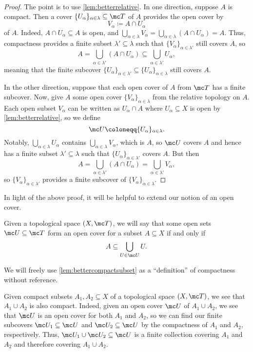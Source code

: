 \documentclass[../notes.tex]{subfiles}
\begin{document}
\begin{proof}
	The point is to use \autoref{lem:betterrelative}. In one direction, suppose $A$ is compact. Then a cover $\{U_\alpha\}_{\alpha\in\lambda}\subseteq\mc T$ of $A$ provides the open cover by
	\[V_\alpha\coloneqq A\cap U_\alpha\]
	of $A$. Indeed, $A\cap U_\alpha\subseteq A$ is open, and $\bigcup_{\alpha\in\lambda}V_\alpha=\bigcup_{\alpha\in\lambda}(A\cap U_\alpha)=A$. Thus, compactness provides a finite subset $\lambda'\subseteq\lambda$ such that $\{V_\alpha\}_{\alpha\in\lambda'}$ still covers $A$, so
	\[A=\bigcup_{\alpha\in\lambda'}(A\cap U_\alpha)\subseteq\bigcup_{\alpha\in\lambda'}U_\alpha,\]
	meaning that the finite subcover $\{U_\alpha\}_{\alpha\in\lambda'}\subseteq\{U_\alpha\}_{\alpha\in\lambda}$ still covers $A$.
	
	In the other direction, suppose that each open cover of $A$ from $\mc T$ has a finite subcover. Now, give $A$ some open cover $\{V_\alpha\}_{\alpha\in\lambda}$ from the relative topology on $A$. Each open subset $V_\alpha$ can be written as $U_\alpha\cap A$ where $U_\alpha\subseteq X$ is open by \autoref{lem:betterrelative}, so we define
	\[\mc U\coloneqq\{U_\alpha\}_{\alpha\in\lambda}.\]
	Notably, $\bigcup_{\alpha\in\lambda}U_\alpha$ contains $\bigcup_{\alpha\in\lambda}V_\alpha$, which is $A$, so $\mc U$ covers $A$ and hence has a finite subset $\lambda'\subseteq\lambda$ such that $\{U_\alpha\}_{\alpha\in\lambda'}$ covers $A$. But then
	\[A=\bigcup_{\alpha\in\lambda'}(A\cap U_\alpha)=\bigcup_{\alpha\in\lambda'}V_\alpha,\]
	so $\{V_\alpha\}_{\alpha\in\lambda'}$ provides a finite subcover of $\{V_\alpha\}_{\alpha\in\lambda}$.
\end{proof}
In light of the above proof, it will be helpful to extend our notion of an open cover.
\begin{notation}
	Given a topological space $(X,\mc T)$, we will say that some open sets $\mc U\subseteq\mc T$ form an open cover for a subset $A\subseteq X$ if and only if
	\[A\subseteq\bigcup_{U\in\mc U}U.\]
\end{notation}
\begin{remark}
	We will freely use \autoref{lem:bettercompactsubset} as a ``definition'' of compactness without reference.
\end{remark}
\begin{example} \label{ex:finite-union-compacts}
	Given compact subsets $A_1,A_2\subseteq X$ of a topological space $(X,\mc T)$, we see that $A_1\cup A_2$ is also compact. Indeed, given an open cover $\mc U$ of $A_1\cup A_2$, we see that $\mc U$ is an open cover for both $A_1$ and $A_2$, so we can find our finite subcovers $\mc U_1\subseteq\mc U$ and $\mc U_2\subseteq\mc U$ by the compactness of $A_1$ and $A_2$, respectively. Thus, $\mc U_1\cup\mc U_2\subseteq\mc U$ is a finite collection covering $A_1$ and $A_2$ and therefore covering $A_1\cup A_2$.
\end{example}
\end{document}
